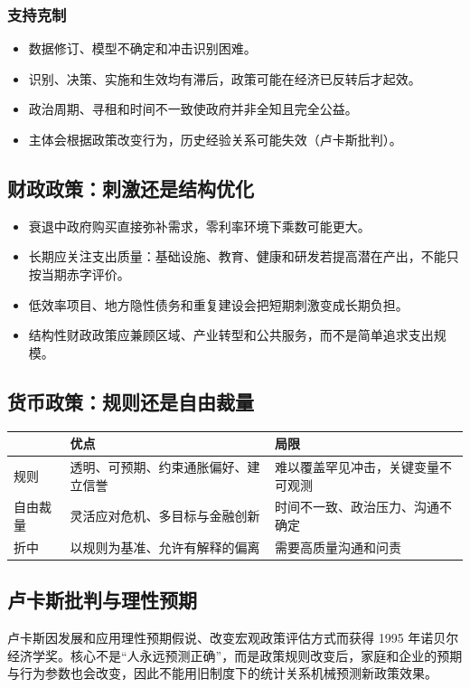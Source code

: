 \documentclass[UTF8,11pt,a4paper]{ctexart}
\begin{document}
\subsubsection{支持克制}
\begin{itemize}
  \item 数据修订、模型不确定和冲击识别困难。
  \item 识别、决策、实施和生效均有滞后，政策可能在经济已反转后才起效。
  \item 政治周期、寻租和时间不一致使政府并非全知且完全公益。
  \item 主体会根据政策改变行为，历史经验关系可能失效（卢卡斯批判）。
\end{itemize}

\subsection{财政政策：刺激还是结构优化}
\begin{itemize}
  \item 衰退中政府购买直接弥补需求，零利率环境下乘数可能更大。
  \item 长期应关注支出质量：基础设施、教育、健康和研发若提高潜在产出，不能只按当期赤字评价。
  \item 低效率项目、地方隐性债务和重复建设会把短期刺激变成长期负担。
  \item 结构性财政政策应兼顾区域、产业转型和公共服务，而不是简单追求支出规模。
\end{itemize}

\subsection{货币政策：规则还是自由裁量}
\begin{longtable}{p{}p{}p{}}
\toprule
 & 优点 & 局限\\
\midrule
规则 & 透明、可预期、约束通胀偏好、建立信誉 & 难以覆盖罕见冲击，关键变量不可观测\\
自由裁量 & 灵活应对危机、多目标与金融创新 & 时间不一致、政治压力、沟通不确定\\
折中 & 以规则为基准、允许有解释的偏离 & 需要高质量沟通和问责\\
\bottomrule
\end{longtable}

\subsection{卢卡斯批判与理性预期}
卢卡斯因发展和应用理性预期假说、改变宏观政策评估方式而获得 1995 年诺贝尔经济学奖。核心不是“人永远预测正确”，而是政策规则改变后，家庭和企业的预期与行为参数也会改变，因此不能用旧制度下的统计关系机械预测新政策效果。
\end{document}
